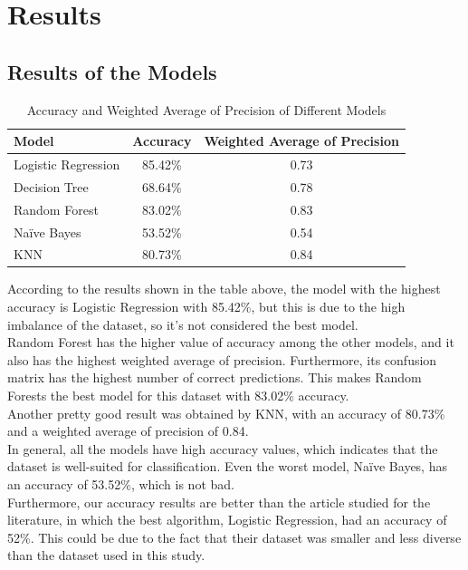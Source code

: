 

\chapter{Results}

\section{Results of the Models}

\begin{table}[htbp]
    \centering
    \begin{tabular}{|l|c|c|}
    \hline
    \textbf{Model}           & \textbf{Accuracy} & \textbf{Weighted Average of Precision} \\ \hline
    Logistic Regression & 85.42\%          & 0.73                \\ \hline
    Decision Tree       & 68.64\%          & 0.78              \\ \hline
    Random Forest      & 83.02\%          & 0.83             \\ \hline
    Naïve Bayes         & 53.52\%          & 0.54               \\ \hline
    KNN                 & 80.73\%          & 0.84               \\ \hline
    \end{tabular}
    \caption{Accuracy and Weighted Average of Precision of Different Models}
    \end{table}
    
According to the results shown in the table above, the model with the highest accuracy is Logistic Regression with 85.42\%, but this is due to the high imbalance of the dataset, so it's not considered the best model.\\
Random Forest has the higher value of accuracy among the other models, and it also has the highest weighted average of precision. Furthermore, its confusion matrix has the highest number of correct predictions. This makes Random Forests the best model for this dataset with 83.02\% accuracy. \\
Another pretty good result was obtained by KNN, with an accuracy of 80.73\% and a weighted average of precision of 0.84.\\
In general, all the models have high accuracy values, which indicates that the dataset is well-suited for classification. Even the worst model, Naïve Bayes, has an accuracy of 53.52\%, which is not bad.\\
Furthermore, our accuracy results are better than the article studied for the literature, in which the best algorithm, Logistic Regression, had an accuracy of 52\%. This could be due to the fact that their dataset was smaller and less diverse than the dataset used in this study.
\\

